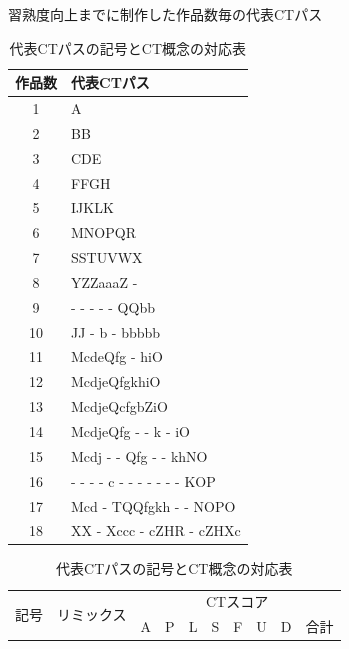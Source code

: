 \documentclass[11pt,dvipdfmx]{jreport}
\begin{document}
\begin{table}[h]
  \begin{minipage}[t]{0.45\linewidth} %
    \centering
    \caption{習熟度向上までに制作した作品数毎の代表CTパス}
    \label{tab:split-ct-dtom}
    \vspace{2mm}
  \begin{tabular}{c|l}
    \hline
    作品数 & 代表CTパス\\
    \hline
    \hline
    1 & A \\
    \hline
    2 & BB \\
    \hline
    3 & CDE \\
    \hline
    4 & FFGH \\
    \hline
    5 & IJKLK \\
    \hline
    6 & MNOPQR \\
    \hline
    7 & SSTUVWX  \\
    \hline
    8 & YZZaaaZ - \\
    \hline
    9 & - - - - - QQbb \\
    \hline
    10 & JJ - b - bbbbb \\
    \hline
    11 & McdeQfg - hiO \\
    \hline
    12 & McdjeQfgkhiO \\
    \hline
    13 & McdjeQcfgbZiO \\
    \hline
    14 & McdjeQfg - - k - iO \\
    \hline
    15 & Mcdj - - Qfg - - khNO \\
    \hline
    16 & - - - - c - - - - - - - KOP \\
    \hline
    17 & Mcd - TQQfgkh - - NOPO \\
    \hline
    18 & XX - Xccc - cZHR - cZHXc  \\
    \hline
  \end{tabular}
  \end{minipage}%
  \begin{minipage}[t]{0.55\linewidth}
    \centering
    \caption{代表CTパスの記号とCT概念の対応表}
    \label{tab:dict-dtom}
    \vspace{8mm}
      \begin{tabular}{c|c|cccccccc}
\hline
\multirow{2}{*}{記号} & \multicolumn{1}{l|}{\multirow{2}{*}{\small{リミックス}}} & \multicolumn{8}{c}{CTスコア}                                                                                                                                                         \\ \cline{3-10} 
                    & \multicolumn{1}{l|}{}                       & \multicolumn{1}{c|}{A} & \multicolumn{1}{c|}{P} & \multicolumn{1}{c|}{L} & \multicolumn{1}{c|}{S} & \multicolumn{1}{c|}{F} & \multicolumn{1}{c|}{U} & \multicolumn{1}{c|}{D} & 合計 \\ \hline \hline

\end{tabular}
\end{minipage}
\end{table}
\end{document}
